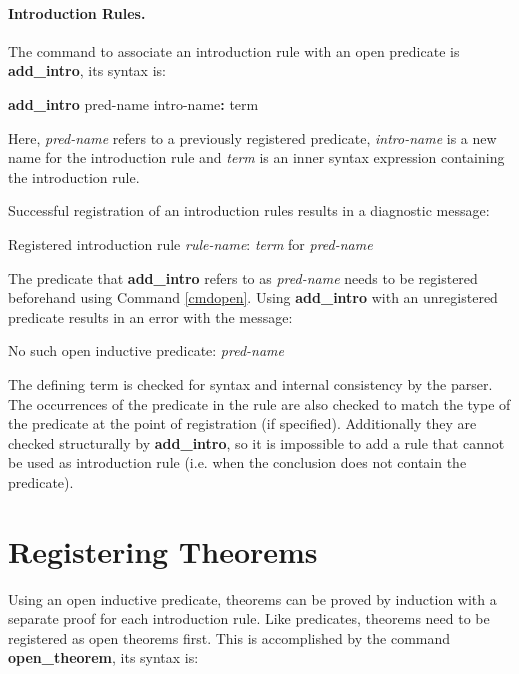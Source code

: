 \paragraph{Introduction Rules.}

The command to associate an introduction rule with an open predicate is \textbf{add\_intro}, its syntax is:
%

\begin{cmd} \label{cmdintro}
\textbf{add\_intro} pred-name intro-name\textbf{:} term
\end{cmd}
Here, \emph{pred-name} refers to a previously registered predicate, \emph{intro-name} is a new name for the introduction rule and \emph{term} is an inner syntax expression containing the introduction rule.
%

Successful registration of an introduction rules results in a diagnostic message:
%

\begin{msg}
Registered introduction rule \emph{rule-name}: \emph{term} for \emph{pred-name}
\end{msg}

The predicate that \textbf{add\_intro} refers to as \emph{pred-name} needs to be registered beforehand using Command \ref{cmdopen}.
%
Using \textbf{add\_intro} with an unregistered predicate results in an error with the message:
%

\begin{err}
No such open inductive predicate: \emph{pred-name}
\end{err}

The defining term is checked for syntax and internal consistency by the parser.
%
The occurrences of the predicate in the rule are also checked to match the type of the predicate at the point of registration (if specified).
%
Additionally they are checked structurally by \textbf{add\_intro}, so it is impossible to add a rule that cannot be used as introduction rule (i.e. when the conclusion does not contain the predicate).
%

\section{Registering Theorems}

Using an open inductive predicate, theorems can be proved by induction with a separate proof for each introduction rule.
%
Like predicates, theorems need to be registered as open theorems first.
%
This is accomplished by the command \textbf{open\_theorem}, its syntax is:
%

